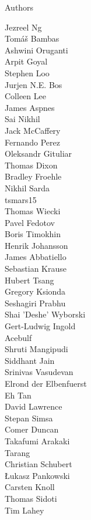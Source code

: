 \documentclass[xcolor=svgnames]{beamer}
\begin{document}
\begin{frame}{Authors}
\begin{multicols}{5}
    Jezreel Ng\\
    Tomáš Bambas\\
    Ashwini Oruganti\\
    Arpit Goyal\\
    Stephen Loo\\
    Jurjen N.E. Bos\\
    Colleen Lee\\
    James Aspnes\\
    Sai Nikhil\\
    Jack McCaffery\\
    Fernando Perez\\
    Oleksandr Gituliar\\
    Thomas Dixon\\
    Bradley Froehle\\
    Nikhil Sarda\\
    tsmars15\\
    Thomas Wiecki\\
    Pavel Fedotov\\
    Boris Timokhin\\
    Henrik Johansson\\
    James Abbatiello\\
    Sebastian Krause\\
    Hubert Tsang\\
    Gregory Ksionda\\
    Seshagiri Prabhu\\
    Shai 'Deshe' Wyborski\\
    Gert-Ludwig Ingold\\
    Acebulf\\
    Shruti Mangipudi\\
    Siddhant Jain\\
    Srinivas Vasudevan\\
    Elrond der Elbenfuerst\\
    Eh Tan\\
    David Lawrence\\
    Stepan Simsa\\
    Comer Duncan\\
    Takafumi Arakaki\\
    Tarang\\
    Christian Schubert\\
    Łukasz Pankowski\\
    Carsten Knoll\\
    Thomas Sidoti\\
    Tim Lahey\\

\end{multicols}
\end{frame}
\end{document}
